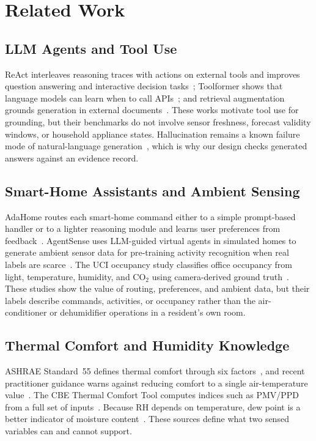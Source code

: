 \documentclass[conference]{IEEEtran}
\begin{document}
\section{Related Work}
\subsection{LLM Agents and Tool Use}
ReAct interleaves reasoning traces with actions on external tools and improves question answering and interactive decision tasks~\cite{yao2023react}; Toolformer shows that language models can learn when to call APIs~\cite{schick2023toolformer}; and retrieval augmentation grounds generation in external documents~\cite{lewis2020rag}. These works motivate tool use for grounding, but their benchmarks do not involve sensor freshness, forecast validity windows, or household appliance states. Hallucination remains a known failure mode of natural-language generation~\cite{ji2023hallucination}, which is why our design checks generated answers against an evidence record.

\subsection{Smart-Home Assistants and Ambient Sensing}
AdaHome routes each smart-home command either to a simple prompt-based handler or to a lighter reasoning module and learns user preferences from feedback~\cite{lim2026adahome}. AgentSense uses LLM-guided virtual agents in simulated homes to generate ambient sensor data for pre-training activity recognition when real labels are scarce~\cite{leng2025agentsense}. The UCI occupancy study classifies office occupancy from light, temperature, humidity, and CO$_2$ using camera-derived ground truth~\cite{candanedo2016occupancy}. These studies show the value of routing, preferences, and ambient data, but their labels describe commands, activities, or occupancy rather than the air-conditioner or dehumidifier operations in a resident's own room.

\subsection{Thermal Comfort and Humidity Knowledge}
ASHRAE Standard~55 defines thermal comfort through six factors~\cite{ashrae55}, and recent practitioner guidance warns against reducing comfort to a single air-temperature value~\cite{mishra2026myths}. The CBE Thermal Comfort Tool computes indices such as PMV/PPD from a full set of inputs~\cite{tartarini2020cbe}. Because RH depends on temperature, dew point is a better indicator of moisture content~\cite{nws_dewpoint,lawrence2005dewpoint}. These sources define what two sensed variables can and cannot support.
\end{document}
